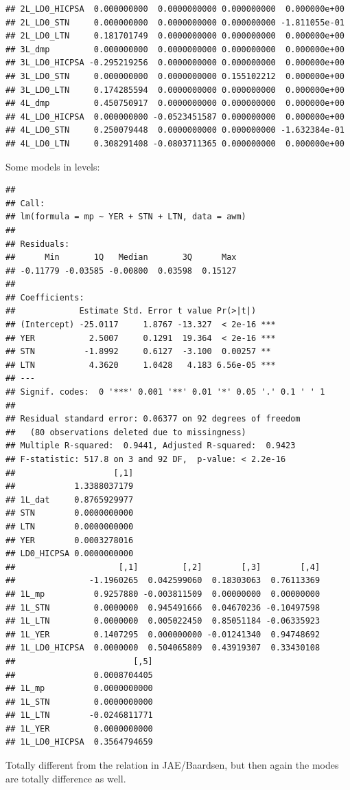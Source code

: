 \documentclass[11pt,oneside, a4paper]{amsart}\usepackage[]{graphicx}\usepackage[]{color}
\makeatletter
\newenvironment{kframe}{%
 \def\at@end@of@kframe{}%
 \ifinner\ifhmode%
  \def\at@end@of@kframe{\end{minipage}}%
  \begin{minipage}{\columnwidth}%
 \fi\fi%
 \def\FrameCommand##1{\hskip\@totalleftmargin \hskip-\fboxsep
 \colorbox{shadecolor}{##1}\hskip-\fboxsep
     \hskip-\linewidth \hskip-\@totalleftmargin \hskip\columnwidth}%
 \MakeFramed {\advance\hsize-\width
   \@totalleftmargin\z@ \linewidth\hsize
   \@setminipage}}%
 {\par\unskip\endMakeFramed%
 \at@end@of@kframe}
\newenvironment{knitrout}{}{} %
\makeatother
\begin{document}
\begin{knitrout}
\begin{kframe}
\begin{verbatim}
## 2L_LD0_HICPSA  0.000000000  0.0000000000 0.000000000  0.000000e+00
## 2L_LD0_STN     0.000000000  0.0000000000 0.000000000 -1.811055e-01
## 2L_LD0_LTN     0.181701749  0.0000000000 0.000000000  0.000000e+00
## 3L_dmp         0.000000000  0.0000000000 0.000000000  0.000000e+00
## 3L_LD0_HICPSA -0.295219256  0.0000000000 0.000000000  0.000000e+00
## 3L_LD0_STN     0.000000000  0.0000000000 0.155102212  0.000000e+00
## 3L_LD0_LTN     0.174285594  0.0000000000 0.000000000  0.000000e+00
## 4L_dmp         0.450750917  0.0000000000 0.000000000  0.000000e+00
## 4L_LD0_HICPSA  0.000000000 -0.0523451587 0.000000000  0.000000e+00
## 4L_LD0_STN     0.250079448  0.0000000000 0.000000000 -1.632384e-01
## 4L_LD0_LTN     0.308291408 -0.0803711365 0.000000000  0.000000e+00
\end{verbatim}
\end{kframe}
\end{knitrout}


Some models in levels:
\begin{knitrout}
\color{fgcolor}\begin{kframe}
\begin{verbatim}
## 
## Call:
## lm(formula = mp ~ YER + STN + LTN, data = awm)
## 
## Residuals:
##      Min       1Q   Median       3Q      Max 
## -0.11779 -0.03585 -0.00800  0.03598  0.15127 
## 
## Coefficients:
##             Estimate Std. Error t value Pr(>|t|)    
## (Intercept) -25.0117     1.8767 -13.327  < 2e-16 ***
## YER           2.5007     0.1291  19.364  < 2e-16 ***
## STN          -1.8992     0.6127  -3.100  0.00257 ** 
## LTN           4.3620     1.0428   4.183 6.56e-05 ***
## ---
## Signif. codes:  0 '***' 0.001 '**' 0.01 '*' 0.05 '.' 0.1 ' ' 1
## 
## Residual standard error: 0.06377 on 92 degrees of freedom
##   (80 observations deleted due to missingness)
## Multiple R-squared:  0.9441,	Adjusted R-squared:  0.9423 
## F-statistic: 517.8 on 3 and 92 DF,  p-value: < 2.2e-16
##                    [,1]
##            1.3388037179
## 1L_dat     0.8765929977
## STN        0.0000000000
## LTN        0.0000000000
## YER        0.0003278016
## LD0_HICPSA 0.0000000000
##                     [,1]         [,2]        [,3]        [,4]
##               -1.1960265  0.042599060  0.18303063  0.76113369
## 1L_mp          0.9257880 -0.003811509  0.00000000  0.00000000
## 1L_STN         0.0000000  0.945491666  0.04670236 -0.10497598
## 1L_LTN         0.0000000  0.005022450  0.85051184 -0.06335923
## 1L_YER         0.1407295  0.000000000 -0.01241340  0.94748692
## 1L_LD0_HICPSA  0.0000000  0.504065809  0.43919307  0.33430108
##                        [,5]
##                0.0008704405
## 1L_mp          0.0000000000
## 1L_STN         0.0000000000
## 1L_LTN        -0.0246811771
## 1L_YER         0.0000000000
## 1L_LD0_HICPSA  0.3564794659
\end{verbatim}
\end{kframe}
\end{knitrout}
Totally different from the relation in JAE/Baardsen, but then again the modes are totally difference as well.
\end{document}
